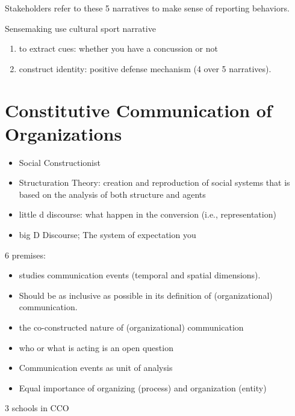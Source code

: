 \documentclass[
]{book}
\providecommand{\tightlist}{%
  \setlength{\itemsep}{0pt}\setlength{\parskip}{0pt}}
\begin{document}
Stakeholders refer to these 5 narratives to make sense of reporting behaviors.

Sensemaking use cultural sport narrative

\begin{enumerate}
\def\labelenumi{\arabic{enumi}.}
\tightlist
\item
  to extract cues: whether you have a concussion or not
\item
  construct identity: positive defense mechanism (4 over 5 narratives).
\end{enumerate}

\hypertarget{constitutive-communication-of-organizations}{%
\chapter{Constitutive Communication of Organizations}\label{constitutive-communication-of-organizations}}

\begin{itemize}
\tightlist
\item
  Social Constructionist
\item
  Structuration Theory: creation and reproduction of social systems that is based on the analysis of both structure
  and agents
\item
  little d discourse: what happen in the conversion (i.e., representation)
\item
  big D Discourse; The system of expectation you
\end{itemize}

\citep{Schoeneborn_2017}

6 premises:

\begin{itemize}
\tightlist
\item
  studies communication events (temporal and spatial dimensions).
\item
  Should be as inclusive as possible in its definition of (organizational) communication.
\item
  the co-constructed nature of (organizational) communication
\item
  who or what is acting is an open question
\item
  Communication events as unit of analysis
\item
  Equal importance of organizing (process) and organization (entity)
\end{itemize}

3 schools in CCO
\end{document}
